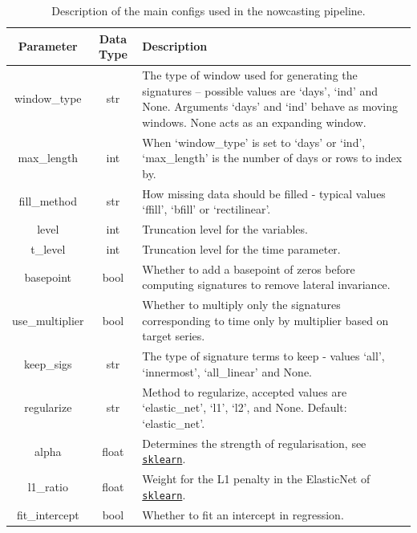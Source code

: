 \documentclass[a4paper, 12pt]{article}
\theoremstyle{remark}
\begin{document}
\begin{table}[]
    \centering
    \caption{Description of the main configs used in the nowcasting pipeline.}
    
    \begin{tabular}{c c m{18em}}
    
        Parameter & Data Type & Description \\
        \hline
        \hline
        window\_type & str & The type of window used for generating the signatures -- possible values are `days', `ind' and None. Arguments `days' and `ind' behave as moving windows. None acts as an expanding window. \\
        \hline
        max\_length & int & When `window\_type' is set to `days' or `ind', `max\_length' is the number of days or rows to index by.\\
        \hline
        fill\_method & str & How missing data should be filled - typical values `ffill', `bfill' or `rectilinear'. \\
        \hline
        level & int & Truncation level for the variables.\\
        \hline
        t\_level & int & Truncation level for the time parameter.  \\
        \hline
        basepoint & bool & Whether to add a basepoint of zeros before computing signatures to remove lateral invariance.\\
        \hline
        use\_multiplier & bool & Whether to multiply only the signatures corresponding to time only by multiplier based on target series. \\
        \hline
        keep\_sigs & str & The type of signature terms to keep - values `all', `innermost', `all\_linear' and None.\\
        \hline
        regularize & str & Method to regularize, accepted values are `elastic\_net', `l1', `l2', and None. Default: `elastic\_net'.\\
        \hline
        alpha & float & Determines the strength of regularisation, see \href{https://scikit-learn.org/stable/modules/generated/sklearn.linear_model.ElasticNet.html}{\texttt{sklearn}}.\\
        \hline
        l1\_ratio & float & Weight for the L1 penalty in the ElasticNet of \href{https://scikit-learn.org/stable/modules/generated/sklearn.linear_model.ElasticNet.html}{\texttt{sklearn}}.\\
        \hline
        fit\_intercept & bool & Whether to fit an intercept in regression.\\

\end{tabular}
\end{table}
\end{document}
